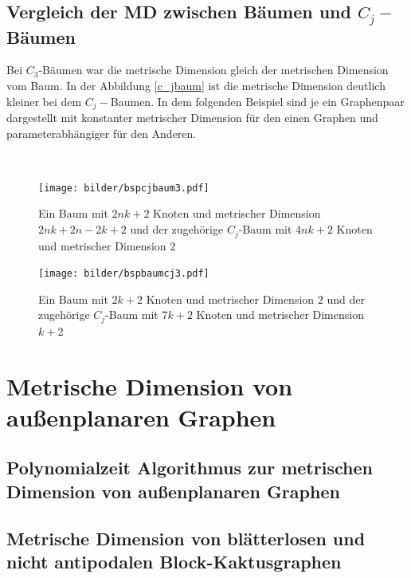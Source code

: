 \section{Vergleich der MD zwischen Bäumen und $C_j-$Bäumen}
Bei $C_3$-Bäumen war die metrische Dimension gleich der metrischen Dimension vom Baum. In der Abbildung \ref{c_jbaum} ist die metrische Dimension deutlich kleiner bei dem $C_j-$Baumen. In dem folgenden Beispiel sind je ein Graphenpaar dargestellt mit konstanter metrischer Dimension für den einen Graphen und parameterabhängiger für den Anderen.
\begin{bsp}~\newline
\vspace{-4mm}
\begin{figure}[ht]
\centering
\texttt{[image: bilder/bspcjbaum3.pdf]}
\caption{Ein Baum mit $2nk+2$ Knoten und metrischer Dimension $2nk+2n-2k+2$ und der zugehörige $C_j$-Baum mit $4nk+2$ Knoten und metrischer Dimension $2$}
\end{figure}
\vspace{-4mm}
\begin{figure}[ht]
\centering
\texttt{[image: bilder/bspbaumcj3.pdf]}
\caption{Ein Baum mit $2k+2$ Knoten und metrischer Dimension $2$ und der zugehörige $C_j$-Baum mit $7k+2$ Knoten und metrischer Dimension $k+2$}
\end{figure}
\end{bsp}
\chapter{Metrische Dimension von außenplanaren Graphen%
}
\label{aussenpalanar}
\section{Polynomialzeit Algorithmus zur metrischen Dimension von außenplanaren Graphen}
\section{Metrische Dimension von blätterlosen und nicht antipodalen Block-Kaktusgraphen}
